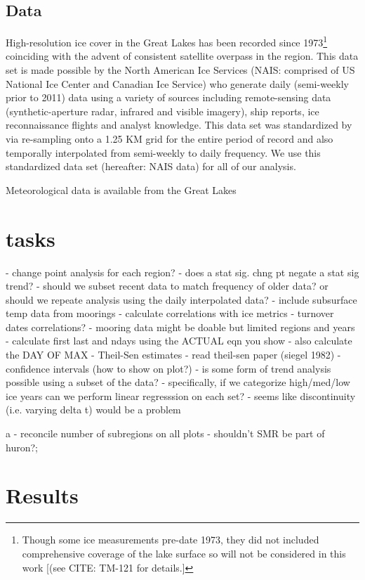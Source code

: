 \documentclass{article}
\begin{document}
\subsection{Data}
High-resolution ice cover in the Great Lakes has been recorded since 1973\footnote{Though some ice measurements pre-date 1973, they did not included comprehensive coverage of the lake surface so will not be considered in this work [(see CITE: TM-121 for details.]} coinciding with the advent of consistent satellite overpass in the region. This data set is made possible by the North American Ice Services (NAIS: comprised of US National Ice Center and Canadian Ice Service) who generate daily (semi-weekly prior to 2011) data using a variety of sources including remote-sensing data (synthetic-aperture radar, infrared and visible imagery), ship reports, ice reconnaissance flights and analyst knowledge. This data set was standardized by \textcite{Yang_2020} via re-sampling onto a 1.25 KM grid for the entire period of record and also temporally interpolated from semi-weekly to daily frequency. We use this standardized data set (hereafter: NAIS data) for all of our analysis.

Meteorological data is available from the Great Lakes 



\section{tasks}

\begin{markdown}
- change point analysis for each region?
	- does a stat sig. chng pt negate a stat sig trend?
- should we subset recent data to match frequency of older data?  or should we repeate analysis using the daily interpolated data?
- include subsurface temp data from moorings
	- calculate correlations with ice metrics
	- turnover dates correlations?
- mooring data might be doable but limited regions and years
- calculate first last and ndays using the ACTUAL eqn you show
- also calculate the DAY OF MAX
- Theil-Sen estimates
- read theil-sen paper (siegel 1982)
- confidence intervals (how to show on plot?)
- is some form of trend analysis possible using a subset of the data?
	- specifically, if we categorize high/med/low ice years can we perform linear regresssion on each set?
	- seems like discontinuity (i.e. varying delta t) would be a problem

a
- reconcile number of subregions on all plots
	- shouldn't SMR be part of huron?;
\end{markdown}





\section{Results}

\printbibliography
\end{document}
